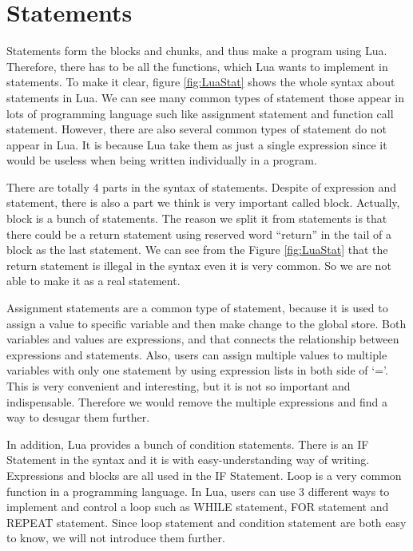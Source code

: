 \section{Statements}
Statements form the blocks and chunks, and thus make a program using Lua. Therefore, there has to be all the functions, which Lua wants to implement in statements. To make it clear, figure \ref{fig:LuaStat} shows the whole syntax about statements in Lua. We can see many common types of statement those appear in lots of programming language such like assignment statement and function call statement. However, there are also several common types of statement do not appear in Lua. It is because Lua take them as just a single expression since it would be useless when being written individually in a program.

There are totally 4 parts in the syntax of statements. Despite of expression and statement, there is also a part we think is very important called block. Actually, block is a bunch of statements. The reason we split it from statements is that there could be a return statement using reserved word ``return'' in the tail of a block as the last statement. We can see from the Figure \ref{fig:LuaStat} that the return statement is illegal in the syntax even it is very common. So we are not able to make it as a real statement.

Assignment statements are a common type of statement, because it is used to assign a value to specific variable and then make change to the global store. Both variables and values are expressions, and that connects the relationship between expressions and statements. Also, users can assign multiple values to multiple variables with only one statement by using expression lists in both side of `='. This is very convenient and interesting, but it is not so important and indispensable. Therefore we would remove the multiple expressions and find a way to desugar them further. 

In addition, Lua provides a bunch of condition statements. There is an IF Statement in the syntax and it is with easy-understanding way of writing. Expressions and blocks are all used in the IF Statement. Loop is a very common function in a programming language. In Lua, users can use 3 different ways to implement and control a loop such as WHILE statement, FOR statement and REPEAT statement. Since loop statement and condition statement are both easy to know, we will not introduce them further.

\newcommand{\assign}[2]{{\overline{#1_i}}~{=}~{\overline{#2_j}}}
\newcommand{\doe}[1]{\mbox{\tt do}~#1~{\tt end}}
\newcommand{\ife}[3]{\mbox{\tt if}~{#1}~\mbox{\tt then}~{#2}~\mbox{\tt else}~{#3}~{\tt end}}
\newcommand{\whilee}[2]{\mbox{\tt while}~#1~{\tt do}~#2~{\tt end}}
\newcommand{\repeate}[2]{\mbox{\tt repeat}~#2~{\tt until}~#1~}
\newcommand{\for}[3]{\mbox{\tt for}~#1~=~#2_1,~#2_2,~#2_3~{\tt do}~#3~{\tt end}}
\newcommand{\function}[3]{\mbox{\tt function}~#1({\overline{#2_i}})~#3~{\tt end}}
\newcommand{\local}[2]{\mbox{\tt local}~{\assign #1 #2}}


